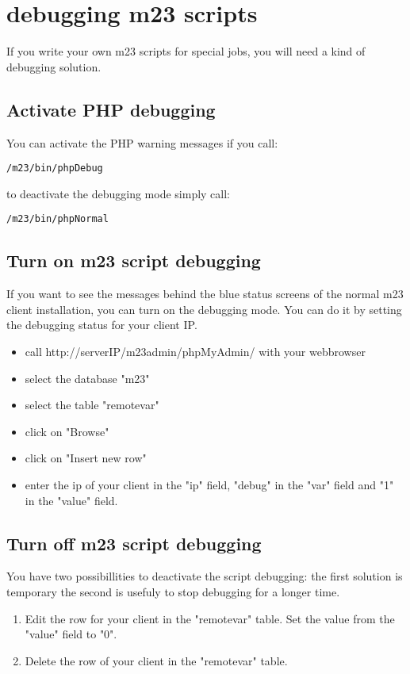 \section{debugging m23 scripts}
If you write your own m23 scripts for special jobs, you will need a kind of debugging solution.

\subsection{Activate PHP debugging}
You can activate the PHP warning messages if you call:
\begin{verbatim}
/m23/bin/phpDebug
\end{verbatim}
to deactivate the debugging mode simply call:
\begin{verbatim}
/m23/bin/phpNormal
\end{verbatim}

\subsection{Turn on m23 script debugging}
If you want to see the messages behind the blue status screens of the normal m23 client installation, you can turn on the debugging mode. You can do it by setting the debugging status for your client IP.
\begin{itemize}
\item call http://serverIP/m23admin/phpMyAdmin/ with your webbrowser
\item select the database "m23"
\item select the table "remotevar"
\item click on "Browse"
\item click on "Insert new row"
\item enter the ip of your client in the "ip" field, "debug" in the "var" field and "1" in the "value" field.
\end{itemize}

\subsection{Turn off m23 script debugging}
You have two possibillities to deactivate the script debugging: the first solution is temporary the second is usefuly to stop debugging for a longer time.
\begin{enumerate}
\item Edit the row for your client in the "remotevar" table. Set the value from the "value" field to "0".
\item Delete the row of your client in the "remotevar" table.
\end{enumerate} 

